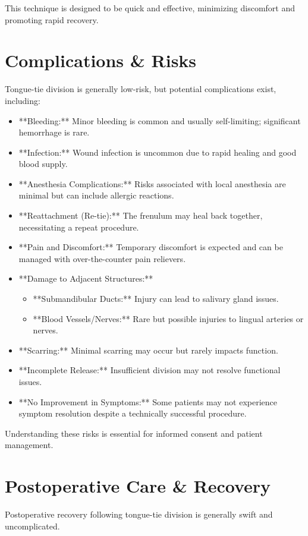 This technique is designed to be quick and effective, minimizing discomfort and promoting rapid recovery.

\section*{Complications \& Risks}
Tongue-tie division is generally low-risk, but potential complications exist, including:

\begin{itemize}
  \item **Bleeding:** Minor bleeding is common and usually self-limiting; significant hemorrhage is rare.
  \item **Infection:** Wound infection is uncommon due to rapid healing and good blood supply.
  \item **Anesthesia Complications:** Risks associated with local anesthesia are minimal but can include allergic reactions.
  \item **Reattachment (Re-tie):** The frenulum may heal back together, necessitating a repeat procedure.
  \item **Pain and Discomfort:** Temporary discomfort is expected and can be managed with over-the-counter pain relievers.
  \item **Damage to Adjacent Structures:**
    \begin{itemize}
      \item **Submandibular Ducts:** Injury can lead to salivary gland issues.
      \item **Blood Vessels/Nerves:** Rare but possible injuries to lingual arteries or nerves.
    \end{itemize}
  \item **Scarring:** Minimal scarring may occur but rarely impacts function.
  \item **Incomplete Release:** Insufficient division may not resolve functional issues.
  \item **No Improvement in Symptoms:** Some patients may not experience symptom resolution despite a technically successful procedure.
\end{itemize}

Understanding these risks is essential for informed consent and patient management.

\section*{Postoperative Care \& Recovery}
Postoperative recovery following tongue-tie division is generally swift and uncomplicated. 

